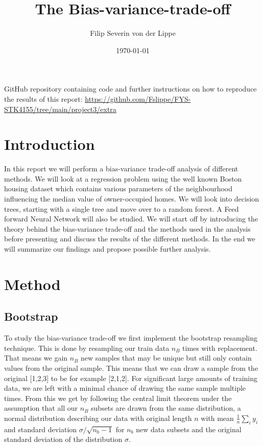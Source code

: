 \documentclass[11pt]{article}
\title{The Bias-variance-trade-off}
\author{Filip Severin von der Lippe}
\date{\today}
\begin{document}
\maketitle
GitHub repository containing code and further instructions on how to reproduce the results of this report: \url{https://github.com/Fslippe/FYS-STK4155/tree/main/project3/extra}

\section{Introduction}
In this report we will perform a bias-variance trade-off analysis of different methods. We will look at a regression problem using the well known Boston housing dataset which contains various parameters of the neighbourhood influencing the median value of owner-occupied homes. We will look into decision trees, starting with a single tree and move over to a random forest. A Feed forward Neural Network will also be studied. We will start off by introducing the theory behind the bias-variance trade-off and the methods used in the analysis before presenting and discuss the results of the different methods. In the end we will summarize our findings and propose possible further analysis.

\section{Method}
\subsection*{Bootstrap}

To study the bias-variance trade-off we first implement the bootstrap resampling technique. This is done by resampling our train data $n_B$ times with replacement. That means we gain $n_B$ new samples that may be unique but still only contain values from the original sample. This means that we can draw a sample from the original [1,2,3] to be for example [2,1,2]. For significant large amounts of training data, we are left with a minimal chance of drawing the same sample multiple times. From this we get by following the central limit theorem under the assumption that all our $n_B$ subsets are drawn from the same distribution, a normal distribution describing our data with original length $n$ with mean $\frac{1}{n}\sum_i y_i$
and standard deviation $\sigma/ \sqrt{n_b-1}$ for $n_b$ new data subsets and the original standard deviation of the distribution $\sigma$.
\end{document}

